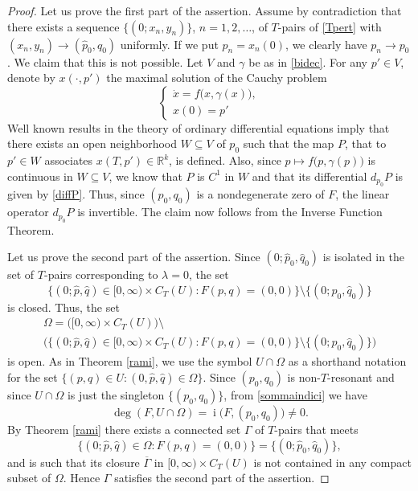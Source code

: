 \documentclass[a4paper]{amsart}
\numberwithin{equation}{section}
\DeclareMathOperator{\idx}{\mathrm{i}}
\newcommand{\cl}[1]{\overline{#1}}
\newcommand{\R}{\mathbb{R}}
\begin{document}
\begin{proof} Let us prove the first part of the assertion. Assume by contradiction that 
there exists a sequence $\{(0;x_n,y_n)\}$, $n=1,2,\ldots$, of $T$-pairs of \eqref{Tpert} 
with $(x_n,y_n)\to (\hat p_0,\hat q_0)$ uniformly. If we put $p_n=x_n(0)$, we clearly have 
$p_n\to p_0$. We claim that this is not possible. 
Let $V$ and $\gamma$ be as in \eqref{bidec}. For any $p'\in V$, denote by $x(\cdot,p')$ 
the maximal solution of the Cauchy problem 
\[
 \left\{
\begin{array}{l}
 \dot x= f\big(x,\gamma(x)\big),\\
  x(0)=p'
\end{array}
\right.
\]
Well known results in the theory of ordinary differential equations imply that there exists
an open neighborhood $W\subseteq V$ of $p_0$ such that the map $P$, that to $p'\in W$ associates $x(T,p')\in\R^k$, is defined. Also, since $p\mapsto f\big(p,\gamma(p)\big)$ is continuous in 
$W\subseteq V$, we know that $P$ is $C^1$ in $W$ and that its differential $d_{p_0}P$ is given 
by \eqref{diffP}. Thus, since $(p_0,q_0)$ is a nondegenerate zero of $F$, the linear operator 
$d_{p_0}P$ is invertible. The claim now follows from the Inverse Function Theorem.

Let us prove the second part of the assertion. Since $(0;\hat p_0,\hat q_0)$ is isolated 
in the set of $T$-pairs corresponding to $\lambda =0$, the set 
\[
\big\{(0;\hat p,\hat q)\in [0,\infty)\times C_T(U):F(p,q)=(0,0)\big\}
\setminus\{(0;\hat p_0,\hat q_0)\}
\]
is closed. Thus, the set 
\begin{multline*}
 \Omega=\Big([0,\infty)\times C_T(U)\Big)\setminus\\
        \Big(\big\{(0;\hat p,\hat q)\in [0,\infty)\times C_T(U):F(p,q)=(0,0)\big\}
\setminus\{(0;\hat p_0,\hat q_0)\}\Big)
\end{multline*}
is open. As in Theorem \ref{rami}, we use the symbol $U\cap\Omega$ as a shorthand notation for 
the set $\{(p,q)\in U:(0,\hat p,\hat q)\in\Omega\}$. Since $(p_0,q_0)$ is non-$T$-resonant and 
since $U\cap\Omega$ is just the singleton $\{(p_0,q_0)\}$, from \eqref{sommaindici} we have
\[
 \deg(F,U\cap\Omega)=\idx\big(F,(p_0,q_0)\big)\neq 0.
\] 
By Theorem \ref{rami} there exists a connected set $\Gamma$ of $T$-pairs that meets
\[
\big\{(0;\hat p,\hat q)\in\Omega:F(p,q)=(0,0)\big\}=\{(0;\hat p_0,\hat q_0)\},
\]
and is such that its closure $\cl{\Gamma}$ in $[0,\infty)\times C_T(U)$ is not contained in 
any compact subset of $\Omega$. Hence $\Gamma$ satisfies the second part of the assertion.
\end{proof}
\end{document}
